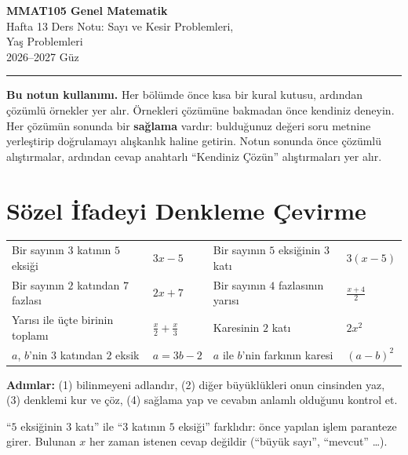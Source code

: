 \documentclass[11pt,a4paper]{article}
\begin{document}
\begin{minipage}[c]{\textwidth}
{\LARGE\bfseries\color{anamavi} MMAT105 Genel Matematik}\\[4pt]
{\large Hafta 13 Ders Notu: Sayı ve Kesir Problemleri,\\ Yaş Problemleri}\\[6pt]
{\small 2026--2027 Güz}
\end{minipage}

\vspace{4pt}\noindent\textcolor{anamavi}{\rule{\textwidth}{1pt}}

\textbf{Bu notun kullanımı.} Her bölümde önce kısa bir kural kutusu, ardından çözümlü örnekler yer alır. Örnekleri çözümüne bakmadan önce kendiniz deneyin. Her çözümün sonunda bir \textbf{sağlama} vardır: bulduğunuz değeri soru metnine yerleştirip doğrulamayı alışkanlık haline getirin. Notun sonunda önce çözümlü alıştırmalar, ardından cevap anahtarlı ``Kendiniz Çözün'' alıştırmaları yer alır.

\section{Sözel İfadeyi Denkleme Çevirme}

\begin{kural}
\begin{center}
\renewcommand{\arraystretch}{1.35}
\begin{tabular}{@{}ll@{\qquad}ll@{}}
Bir sayının \(3\) katının \(5\) eksiği & \(3x-5\) & Bir sayının \(5\) eksiğinin \(3\) katı & \(3(x-5)\)\\
Bir sayının \(2\) katından \(7\) fazlası & \(2x+7\) & Bir sayının \(4\) fazlasının yarısı & \(\tfrac{x+4}{2}\)\\
Yarısı ile üçte birinin toplamı & \(\tfrac{x}{2}+\tfrac{x}{3}\) & Karesinin \(2\) katı & \(2x^2\)\\
\(a\), \(b\)'nin \(3\) katından \(2\) eksik & \(a=3b-2\) & \(a\) ile \(b\)'nin farkının karesi & \((a-b)^2\)
\end{tabular}
\end{center}
\textbf{Adımlar:} (1) bilinmeyeni adlandır, (2) diğer büyüklükleri onun cinsinden yaz, (3) denklemi kur ve çöz, (4) sağlama yap ve cevabın anlamlı olduğunu kontrol et.
\end{kural}

\begin{dikkat}
``\(5\) eksiğinin \(3\) katı'' ile ``\(3\) katının \(5\) eksiği'' farklıdır: önce yapılan işlem paranteze girer. Bulunan \(x\) her zaman istenen cevap değildir (``büyük sayı'', ``mevcut'' \dots).
\end{dikkat}
\end{document}

